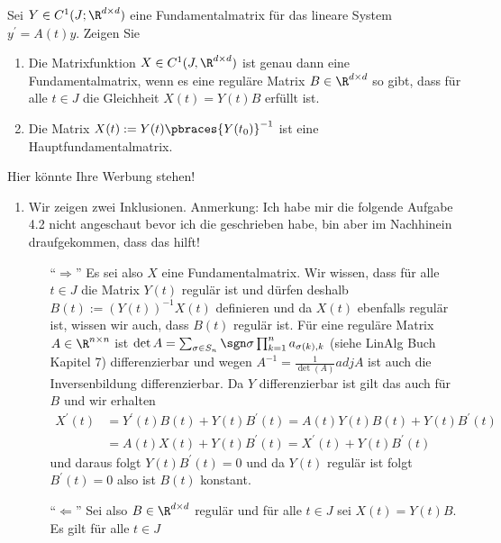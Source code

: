 \begin{exercise}
    Sei $Y \in C^1(J; \R^{d \times d})$ eine Fundamentalmatrix für das lineare System $y^\prime = A(t) y$. Zeigen Sie
    \begin{enumerate}[label = \alph*)]
        \item Die Matrixfunktion $X \in C^1(J, \R^{d \times d})$ ist genau dann eine Fundamentalmatrix, wenn es eine reguläre Matrix $B \in \R^{d \times d}$ so gibt, dass für alle $t \in J$ die Gleichheit $X(t) = Y(t)B$ erfüllt ist.
        \item Die Matrix $X(t) := Y(t) \pbraces{Y(t_0)}^{-1}$ ist eine Hauptfundamentalmatrix.
    \end{enumerate}
\end{exercise}

\begin{solution}
    Hier könnte Ihre Werbung stehen!
    \begin{enumerate}[label = \alph*)]
        \item \label{fundam} Wir zeigen zwei Inklusionen. Anmerkung: Ich habe mir die folgende Aufgabe 4.2 nicht angeschaut bevor ich die geschrieben habe, bin aber im Nachhinein draufgekommen, dass das hilft!
        \begin{enumerate}
            \item[``$\Rightarrow$''] Es sei also $X$ eine Fundamentalmatrix. Wir wissen, dass für alle $t \in J$ die Matrix $Y(t)$ regulär ist und dürfen deshalb $B(t) := (Y(t))^{-1} X(t) $ definieren und da $X(t)$ ebenfalls regulär ist, wissen wir auch, dass $B(t)$ regulär ist. Für eine reguläre Matrix $A \in \R^{n \times n}$ ist $\det A = \sum_{\sigma \in S_n} \sgn \sigma \prod_{k = 1}^n a_{\sigma(k), k}$ (siehe LinAlg Buch Kapitel 7) differenzierbar und wegen $A^{-1} = \frac{1}{\det(A)} adj A$ ist auch die Inversenbildung differenzierbar. Da $Y$ differenzierbar ist gilt das auch für $B$ und wir erhalten
            \begin{align*}
                X^\prime(t) &= Y^\prime(t) B(t) + Y(t) B^\prime(t) = A(t) Y(t) B(t) + Y(t) B^\prime(t) \\
                &= A(t) X(t) + Y(t) B^\prime(t) = X^\prime(t) + Y(t) B^\prime(t)
            \end{align*} 
            und daraus folgt $Y(t) B^\prime(t) = 0$ und da $Y(t)$ regulär ist folgt $B^\prime(t) = 0$ also ist $B(t)$ konstant.
            \item[``$\Leftarrow$''] Sei also $B \in \R^{d \times d}$ regulär und für alle $t \in J$ sei $X(t) = Y(t)B$. Es gilt für alle $t \in J$

\end{enumerate}
\end{enumerate}
\end{solution}
